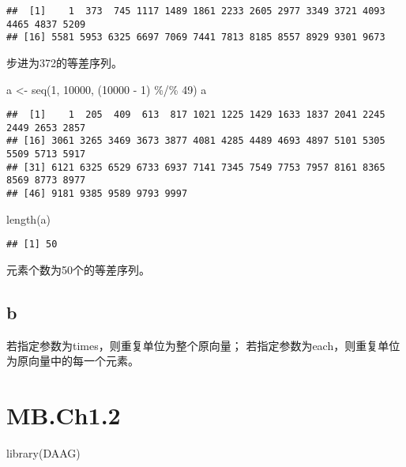\documentclass[
]{article}
\newenvironment{Shaded}{\begin{snugshade}}{\end{snugshade}}
\newcommand{\DecValTok}[1]{\textcolor[rgb]{0.00,0.00,0.81}{#1}}
\newcommand{\FunctionTok}[1]{\textcolor[rgb]{0.00,0.00,0.00}{#1}}
\newcommand{\NormalTok}[1]{#1}
\newcommand{\OtherTok}[1]{\textcolor[rgb]{0.56,0.35,0.01}{#1}}
\newcommand{\SpecialCharTok}[1]{\textcolor[rgb]{0.00,0.00,0.00}{#1}}
\begin{document}
\begin{verbatim}
##  [1]    1  373  745 1117 1489 1861 2233 2605 2977 3349 3721 4093 4465 4837 5209
## [16] 5581 5953 6325 6697 7069 7441 7813 8185 8557 8929 9301 9673
\end{verbatim}

步进为372的等差序列。

\begin{Shaded}
\begin{Highlighting}[]
\NormalTok{a }\OtherTok{\textless{}{-}} \FunctionTok{seq}\NormalTok{(}\DecValTok{1}\NormalTok{, }\DecValTok{10000}\NormalTok{, (}\DecValTok{10000} \SpecialCharTok{{-}} \DecValTok{1}\NormalTok{) }\SpecialCharTok{\%/\%} \DecValTok{49}\NormalTok{)}
\NormalTok{a}
\end{Highlighting}
\end{Shaded}

\begin{verbatim}
##  [1]    1  205  409  613  817 1021 1225 1429 1633 1837 2041 2245 2449 2653 2857
## [16] 3061 3265 3469 3673 3877 4081 4285 4489 4693 4897 5101 5305 5509 5713 5917
## [31] 6121 6325 6529 6733 6937 7141 7345 7549 7753 7957 8161 8365 8569 8773 8977
## [46] 9181 9385 9589 9793 9997
\end{verbatim}

\begin{Shaded}
\begin{Highlighting}[]
\FunctionTok{length}\NormalTok{(a)}
\end{Highlighting}
\end{Shaded}

\begin{verbatim}
## [1] 50
\end{verbatim}

元素个数为50个的等差序列。

\hypertarget{b-2}{%
\subsection{b}\label{b-2}}

若指定参数为times，则重复单位为整个原向量；
若指定参数为each，则重复单位为原向量中的每一个元素。

\hypertarget{mb.ch1.2}{%
\section{MB.Ch1.2}\label{mb.ch1.2}}

\begin{Shaded}
\begin{Highlighting}[]
\FunctionTok{library}\NormalTok{(DAAG)}
\end{Highlighting}
\end{Shaded}
\end{document}
